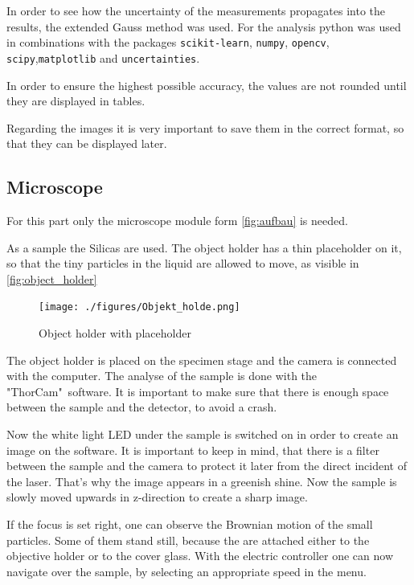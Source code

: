 \documentclass[12pt,english]{scrartcl}
\begin{document}
In order to see how the uncertainty of the measurements propagates into the
results, the extended Gauss method was used. For the analysis python was used
in combinations with the packages \verb#scikit-learn#, \verb#numpy#,
\verb#opencv#, \verb#scipy#,\verb#matplotlib# and \verb#uncertainties#.

In order to ensure the highest possible accuracy, the values are not rounded
until they are displayed in tables.

Regarding the images it is very important to save them in the correct format, so that they can be displayed later.

\subsection{Microscope}\label{seq:durchfurung_microscope}

For this part only the microscope module form \autoref{fig:aufbau} is needed.

As a sample the Silicas are used. The object holder has a thin placeholder on
it, so that the tiny particles in the liquid are allowed to move, as visible in
\autoref{fig:object_holder}

\begin{figure}[H]
	\begin{center}
		\texttt{[image: ./figures/Objekt\_holde.png]}
	\end{center}
	\caption[Object holder with placeholder] { Object holder with placeholder
	}\label{fig:object_holder}
\end{figure}

The object holder is placed on the specimen stage and the camera is connected
with the computer. The analyse of the sample is done with the "ThorCam"\
software. It is important to make sure that there is enough space between the
sample and the detector, to avoid a crash.

Now the white light LED under the sample is switched on in order to create an
image on the software. It is important to keep in mind, that there is a filter
between the sample and the camera to protect it later from the direct incident
of the laser. That's why the image appears in a greenish shine. Now the sample
is slowly moved upwards in z-direction to create a sharp image.

If the focus is set right, one can observe the Brownian motion of the small
particles. Some of them stand still, because the are attached either to the
objective holder or to the cover glass. With the electric controller one can
now navigate over the sample, by selecting an appropriate speed in the menu.
\end{document}
